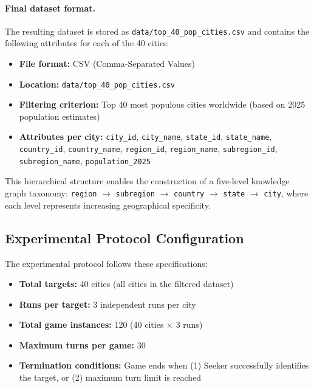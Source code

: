 \documentclass[letterpaper]{article} %
\begin{document}
\paragraph{Final dataset format.} The resulting dataset is stored as \texttt{data/top\_40\_pop\_cities.csv} and contains the following attributes for each of the 40 cities:

\begin{itemize}
    \item \textbf{File format:} CSV (Comma-Separated Values)
    \item \textbf{Location:} \texttt{data/top\_40\_pop\_cities.csv}
    \item \textbf{Filtering criterion:} Top 40 most populous cities worldwide (based on 2025 population estimates)
    \item \textbf{Attributes per city:} \texttt{city\_id}, \texttt{city\_name}, \texttt{state\_id}, \texttt{state\_name}, \texttt{country\_id}, \texttt{country\_name}, \texttt{region\_id}, \texttt{region\_name}, \texttt{subregion\_id}, \texttt{subregion\_name}, \texttt{population\_2025}
\end{itemize}

This hierarchical structure enables the construction of a five-level knowledge graph taxonomy: \texttt{region} $\rightarrow$ \texttt{subregion} $\rightarrow$ \texttt{country} $\rightarrow$ \texttt{state} $\rightarrow$ \texttt{city}, where each level represents increasing geographical specificity.

\subsection{Experimental Protocol Configuration}

The experimental protocol follows these specifications:

\begin{itemize}
    \item \textbf{Total targets:} 40 cities (all cities in the filtered dataset)
    \item \textbf{Runs per target:} 3 independent runs per city
    \item \textbf{Total game instances:} 120 (40 cities $\times$ 3 runs)
    \item \textbf{Maximum turns per game:} 30
    \item \textbf{Termination conditions:} Game ends when (1) Seeker successfully identifies the target, or (2) maximum turn limit is reached
\end{itemize}
\end{document}
